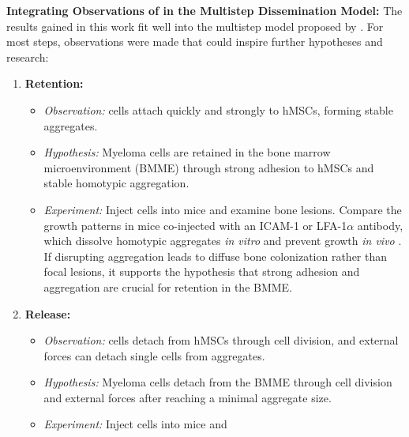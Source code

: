 \textbf{Integrating Observations of \INA in the Multistep Dissemination Model:}
The results gained in this work fit well into the multistep model proposed by
\citet{zeissigTumourDisseminationMultiple2020}. For most steps, observations
were made that could inspire further hypotheses and research:


\begin{enumerate}
      \item \textbf{Retention:}
            \begin{itemize}
                  \item \textit{Observation:} \INA cells attach quickly and
                        strongly to \acp{hMSC}, forming stable aggregates.
                  \item \textit{Hypothesis:} Myeloma cells are retained in the
                        bone marrow microenvironment (BMME) through strong adhesion to
                        \acp{hMSC} and stable homotypic aggregation.
                  \item \textit{Experiment:} Inject \INA cells into mice and
                        examine bone lesions. Compare the growth patterns in mice
                        co-injected with an ICAM-1 or LFA-1$\alpha$ antibody, which
                        dissolve homotypic aggregates \textit{in vitro} and prevent
                        \INA growth \textit{in vivo}
                        \cite{kawanoHomotypicCellAggregations1991a,
                              klauszNovelFcengineeredHuman2017}. If disrupting aggregation
                        leads to diffuse bone colonization rather than focal lesions,
                        it supports the hypothesis that strong adhesion and
                        aggregation are crucial for retention in the \ac{BMME}.
            \end{itemize}
      \item \textbf{Release:}
            \begin{itemize}
                  \item \textit{Observation:} \INA cells detach from \acp{hMSC}
                        through cell division, and external forces can detach single
                        cells from \INA aggregates.
                  \item \textit{Hypothesis:} Myeloma cells detach from the BMME
                        through cell division and external forces after reaching a
                        minimal aggregate size.
                  \item \textit{Experiment:} Inject \INA cells into mice and

\end{itemize}
\end{enumerate}
